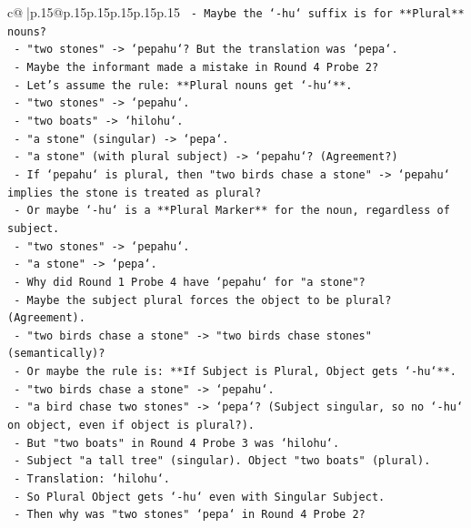 \documentclass{article}
\begin{document}
{\begin{supertabular}{c@{$\;$}|p{.15\linewidth}@{}p{.15\linewidth}p{.15\linewidth}p{.15\linewidth}p{.15\linewidth}p{.15\linewidth}}
{{{\texttt{      {-} Maybe the `{-}hu` suffix is for **Plural** nouns?} \\
\texttt{      {-} "two stones" {-}> `pepahu`? But the translation was `pepa`.} \\
\texttt{      {-} Maybe the informant made a mistake in Round 4 Probe 2?} \\
\texttt{      {-} Let's assume the rule: **Plural nouns get `{-}hu`**.} \\
\texttt{      {-} "two stones" {-}> `pepahu`.} \\
\texttt{      {-} "two boats" {-}> `hilohu`.} \\
\texttt{      {-} "a stone" (singular) {-}> `pepa`.} \\
\texttt{      {-} "a stone" (with plural subject) {-}> `pepahu`? (Agreement?)} \\
\texttt{      {-} If `pepahu` is plural, then "two birds chase a stone" {-}> `pepahu` implies the stone is treated as plural?} \\
\texttt{      {-} Or maybe `{-}hu` is a **Plural Marker** for the noun, regardless of subject.} \\
\texttt{      {-} "two stones" {-}> `pepahu`.} \\
\texttt{      {-} "a stone" {-}> `pepa`.} \\
\texttt{      {-} Why did Round 1 Probe 4 have `pepahu` for "a stone"?} \\
\texttt{      {-} Maybe the subject plural forces the object to be plural? (Agreement).} \\
\texttt{      {-} "two birds chase a stone" {-}> "two birds chase stones" (semantically)?} \\
\texttt{      {-} Or maybe the rule is: **If Subject is Plural, Object gets `{-}hu`**.} \\
\texttt{      {-} "two birds chase a stone" {-}> `pepahu`.} \\
\texttt{      {-} "a bird chase two stones" {-}> `pepa`? (Subject singular, so no `{-}hu` on object, even if object is plural?).} \\
\texttt{      {-} But "two boats" in Round 4 Probe 3 was `hilohu`.} \\
\texttt{      {-} Subject "a tall tree" (singular). Object "two boats" (plural).} \\
\texttt{      {-} Translation: `hilohu`.} \\
\texttt{      {-} So Plural Object gets `{-}hu` even with Singular Subject.} \\
\texttt{      {-} Then why was "two stones" `pepa` in Round 4 Probe 2?} \\
}}}
\end{supertabular}}
\end{document}
